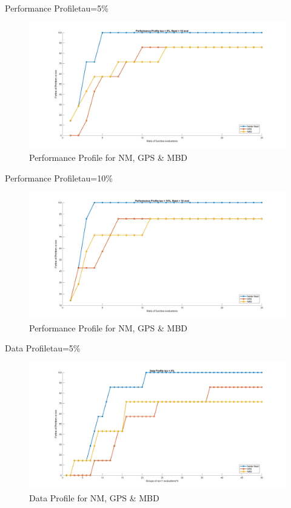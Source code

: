 \documentclass[10pt]{beamer}
\begin{document}
	\begin{frame}{Performance Profile}{tau=5\%}
		\begin{figure}
			\includegraphics[width=\linewidth]{pptau5.jpg}
			\caption{Performance Profile for NM, GPS \& MBD}
		\end{figure}
	\end{frame}
	
	\begin{frame}{Performance Profile}{tau=10\%}
		\begin{figure}
			\includegraphics[width=\linewidth]{pptau10.jpg}
			\caption{Performance Profile for NM, GPS \& MBD}
		\end{figure}
	\end{frame}

	\begin{frame}{Data Profile}{tau=5\%}
		\begin{figure}
			\includegraphics[width=\linewidth]{dptau5.jpg}
			\caption{Data Profile for NM, GPS \& MBD}
		\end{figure}
	\end{frame}
\end{document}
